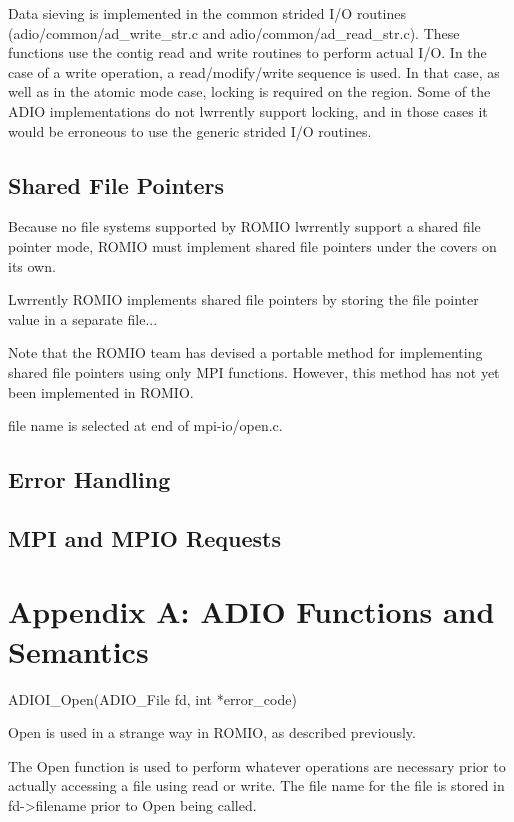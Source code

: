 Data sieving is implemented in the common strided I/O routines
(adio/common/ad\_write\_str.c and adio/common/ad\_read\_str.c).  These functions
use the contig read and write routines to perform actual I/O.  In the case of
a write operation, a read/modify/write sequence is used.  In that case, as
well as in the atomic mode case, locking is required on the region.  Some of
the ADIO implementations do not lwrrently support locking, and in those cases
it would be erroneous to use the generic strided I/O routines.

\subsection{Shared File Pointers}

Because no file systems supported by ROMIO lwrrently support a shared file
pointer mode, ROMIO must implement shared file pointers under the covers on
its own.

Lwrrently ROMIO implements shared file pointers by storing the file pointer
value in a separate file...

Note that the ROMIO team has devised a portable method for implementing shared
file pointers using only MPI functions.  However, this method has
not yet been implemented in ROMIO.

file name is selected at end of mpi-io/open.c.

\subsection{Error Handling}

\subsection{MPI and MPIO Requests}

\section*{Appendix A: ADIO Functions and Semantics}

ADIOI\_Open(ADIO\_File fd, int *error\_code)

Open is used in a strange way in ROMIO, as described previously.

The Open function is used to perform whatever operations are necessary prior
to actually accessing a file using read or write.  The file name for the file
is stored in fd->filename prior to Open being called.

